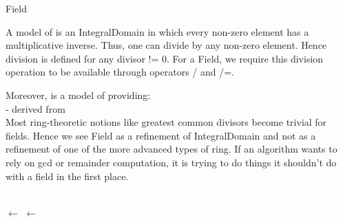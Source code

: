 \begin{ccRefConcept}{Field}


\ccDefinition

A model of  is an IntegralDomain in which every non-zero element has a multiplicative inverse. 
Thus, one can divide by any non-zero element. Hence division is defined for any divisor != 0. 
For a Field, we require this division operation to be available through operators / and /=.

Moreover,  is a model of  providing:\\
-  derived from  \\

Most ring-theoretic notions like greatest common divisors become trivial for fields. 
Hence we see Field as a refinement of IntegralDomain and not as a refinement of one of the more advanced 
types of ring. If an algorithm wants to rely on gcd or remainder computation, it is trying to do things 
it shouldn't do with a field in the first place. 
  
\ccRefines
 \\

\ccSeeAlso
        $ \leftarrow $   
        $ \leftarrow $   

\ccHasModels


\end{ccRefConcept}